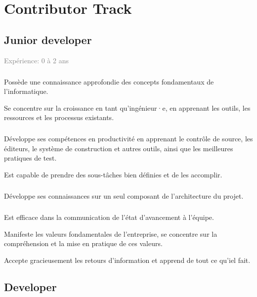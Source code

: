 \documentclass[a4paper, french, openany, 12pt]{book}
\newcommand\dex{\textcolor{BrickRed}{\textbf{\bsc{Dex}}}}
\newcommand\str{\textcolor{DarkOrchid}{\textbf{\bsc{Str}}}}
\newcommand\wis{\textcolor{MidnightBlue}{\textbf{\bsc{Wis}}}}
\newcommand\cha{\textcolor{RawSienna}{\textbf{\bsc{Cha}}}}
\newcommand\xp[1]{\textcolor{Gray}{Expérience: {#1} ans}}
\begin{document}
\part{Contributor Track}

\chapter{Junior developer}

\xp{0 à 2}

\subsubsection*{\dex} 

Possède une connaissance approfondie des concepts fondamentaux de l'informatique.

Se concentre sur la croissance en tant qu'ingénieur·e, en apprenant les outils, les ressources et les processus 
existants.

\subsubsection*{\str}

Développe ses compétences en productivité en apprenant le contrôle de source, les éditeurs, le système de construction 
et autres outils, ainsi que les meilleures pratiques de test.

Est capable de prendre des sous-tâches bien définies et de les accomplir.

\subsubsection*{\wis}

Développe ses connaissances sur un seul composant de l'architecture du projet.

\subsubsection*{\cha}

Est efficace dans la communication de l'état d'avancement à l'équipe.

Manifeste les valeurs fondamentales de l'entreprise, se concentre sur la compréhension et la mise en pratique de ces 
valeurs.

Accepte gracieusement les retours d'information et apprend de tout ce qu'iel fait.

\chapter{Developer}
\end{document}
